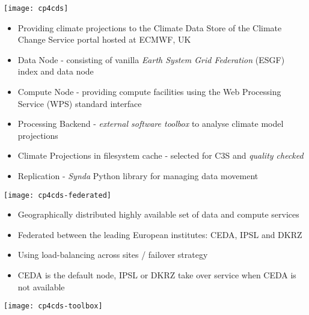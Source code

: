 \documentclass[portrait,a0paper,fontscale=0.4]{baposter} %
\newcommand{\compresslist}{%
\setlength{\itemsep}{1pt}%
\setlength{\parskip}{0pt}%
\setlength{\parsep}{0pt}%
}
\begin{document}
\begin{poster}
{   \begin{minipage}{0.3\textwidth}
     \texttt{[image: cp4cds]}
   \end{minipage}
   \begin{minipage}{0.7\textwidth}
     \begin{itemize}\compresslist
       \item Providing climate projections to the Climate Data Store of the
        Climate Change Service portal hosted at ECMWF, UK
       \item Data Node - consisting of vanilla \emph{Earth System Grid Federation} (ESGF) index and data node
       \item Compute Node - providing compute facilities using the Web Processing Service (WPS) standard interface
       \item Processing Backend - \emph{external software toolbox} to analyse climate model projections
       \item Climate Projections in filesystem cache - selected for C3S and \emph{quality checked}
       \item Replication - \emph{Synda} Python library for managing data movement
     \end{itemize}
     \vspace{2em}
  \end{minipage}
  \begin{minipage}{0.3\textwidth}
    \texttt{[image: cp4cds-federated]}
  \end{minipage}
  \begin{minipage}{0.7\textwidth}
    \begin{itemize}\compresslist
      \item Geographically distributed highly available set of data and compute services
      \item Federated between the leading European institutes: CEDA, IPSL and DKRZ
      \item Using load-balancing across sites / failover strategy
      \item CEDA is the default node, IPSL or DKRZ take over service when CEDA is not available
    \end{itemize}
    \vspace{2em}
  \end{minipage}
  \begin{minipage}{0.3\textwidth}
    \texttt{[image: cp4cds-toolbox]}
  \end{minipage}
  \begin{minipage}{0.7\textwidth}

\end{minipage}}
\end{poster}
\end{document}
